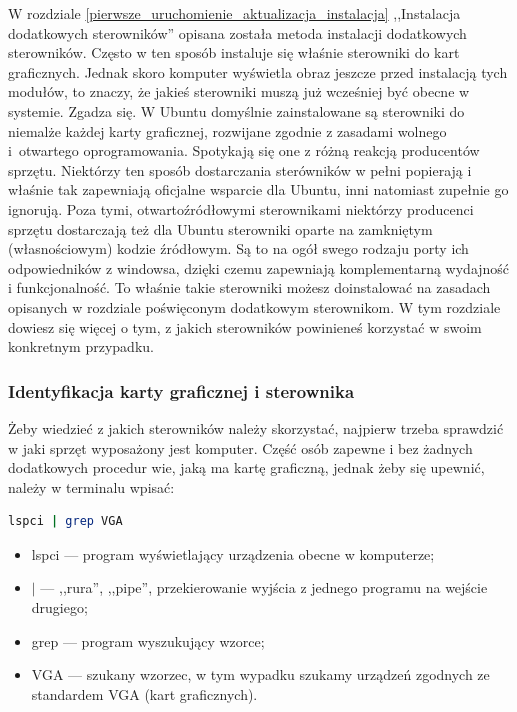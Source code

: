 \label{sterowniki}
W rozdziale \ref{pierwsze_uruchomienie_aktualizacja_instalacja} ,,Instalacja dodatkowych sterowników'' opisana została metoda instalacji dodatkowych sterowników. Często w ten sposób instaluje się właśnie sterowniki do kart graficznych. Jednak skoro komputer wyświetla obraz jeszcze przed instalacją tych modułów, to znaczy, że jakieś sterowniki muszą już wcześniej być obecne w systemie. Zgadza się. W Ubuntu domyślnie zainstalowane są sterowniki do niemalże każdej karty graficznej, rozwijane zgodnie z zasadami wolnego i~otwartego oprogramowania. Spotykają się one z różną reakcją producentów sprzętu. Niektórzy ten sposób dostarczania sterówników w pełni popierają i właśnie tak zapewniają oficjalne wsparcie dla Ubuntu, inni natomiast zupełnie go ignorują. Poza tymi, otwartoźródłowymi sterownikami niektórzy producenci sprzętu dostarczają też dla Ubuntu sterowniki oparte na zamkniętym (własnościowym) kodzie źródłowym. Są to na ogół swego rodzaju porty ich odpowiedników z windowsa, dzięki czemu zapewniają komplementarną wydajność i funkcjonalność. To właśnie takie sterowniki możesz doinstalować na zasadach opisanych w rozdziale poświęconym dodatkowym sterownikom. W tym rozdziale dowiesz się więcej o tym, z jakich sterowników powinieneś korzystać w swoim konkretnym przypadku.

\subsubsection{Identyfikacja karty graficznej i sterownika}
Żeby wiedzieć z jakich sterowników należy skorzystać, najpierw trzeba sprawdzić w jaki sprzęt wyposażony jest komputer. Część osób zapewne i bez żadnych dodatkowych procedur wie, jaką ma kartę graficzną, jednak żeby się upewnić, należy w terminalu wpisać:

\begin{lstlisting}[language=bash]
lspci | grep VGA
\end{lstlisting}
\begin{itemize}
\item \textcolor{ubuntu_orange}{lspci} --- program wyświetlający urządzenia obecne w komputerze;
\item \textcolor{ubuntu_orange}{$|$} --- ,,rura'', ,,pipe'', przekierowanie wyjścia z jednego programu na wejście drugiego;
\item \textcolor{ubuntu_orange}{grep} --- program wyszukujący wzorce;
\item \textcolor{ubuntu_orange}{VGA} --- szukany wzorzec, w tym wypadku szukamy urządzeń zgodnych ze standardem VGA (kart graficznych).
\end{itemize}

